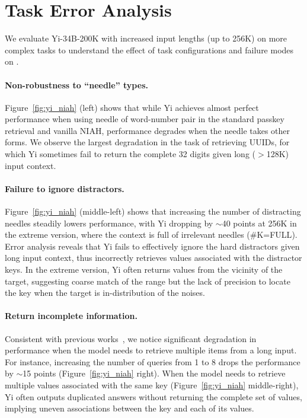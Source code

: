 
\section{Task Error Analysis}
% 
We evaluate Yi-34B-200K with increased input lengths (up to 256K) on more complex tasks to understand the effect of task configurations and failure modes on .
% 
\paragraph{Non-robustness to ``needle'' types.} Figure~\ref{fig:yi_niah} (left) shows that while Yi achieves almost perfect performance when using needle of word-number pair in the standard passkey retrieval and vanilla NIAH, performance degrades when the needle takes other forms. We observe the largest degradation in the task of retrieving UUIDs, for which Yi sometimes fail to return the complete 32 digits given long ($>$128K) input context.

\paragraph{Failure to ignore distractors.}   Figure~\ref{fig:yi_niah} (middle-left) shows that increasing the number of distracting needles steadily lowers performance, with Yi dropping by $\sim$40 points at 256K in the extreme version, where the context is full of irrelevant needles ({\small \#K=FULL}). Error analysis reveals that Yi fails to effectively ignore the hard distractors given long input context, thus incorrectly retrieves values associated with the distractor keys. In the extreme version, Yi often returns values from the vicinity of the target, suggesting coarse match of the range but the lack of precision to locate the key when the target is in-distribution of the noises.

\paragraph{Return incomplete information.} Consistent with previous works~\citep{lwm, gemini}, we notice significant degradation in performance when the model needs to retrieve multiple items from a long input. For instance, increasing the number of queries from 1 to 8 drops the performance by $\sim$15 points (Figure~\ref{fig:yi_niah} right). When the model needs to retrieve multiple values associated with the same key (Figure~\ref{fig:yi_niah} middle-right), Yi often outputs duplicated answers without returning the complete set of values, implying uneven associations between the key and each of its values.




